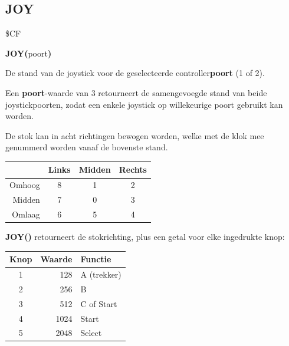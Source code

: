 \subsection{JOY}
\begin{description}[leftmargin=2cm,style=nextline]
\item [Token:]    \$CF

\item [Formaat:]   {\bf JOY(}poort{\bf)}

\item [Retourneert:]  De stand van de joystick voor de geselecteerde controller{\bf poort} (1 of 2).

                  Een {\bf poort}-waarde van 3 retourneert de samengevoegde stand van beide joystickpoorten, zodat een enkele joystick op willekeurige poort gebruikt kan worden.

                  De stok kan in acht richtingen bewogen worden, welke met de klok mee genummerd worden vanaf de bovenste stand.

                  \begin{center}
                  {\setlength{\tabcolsep}{1mm}
                  \begin{tabular}{|r|c|c|c|}
                  \hline
                  &  {\bf Links}  & {\bf Midden} & {\bf Rechts} \\
                  \hline
                  Omhoog   &  8 &    1  & 2 \\                 Midden  &  7 &    0  & 3 \\                  Omlaag  &  6 &    5  & 4 \\
                  \hline
                  \end{tabular}
                  }
                  \end{center}

                  {\bf JOY()} retourneert de stokrichting, plus een getal voor elke ingedrukte knop:

                  \begin{center}
                  \begin{tabular}{|c|r|l|}
                  \hline
                  {\bf Knop} & {\bf Waarde} & {\bf Functie} \\
                  \hline
                  1 & 128 & A (trekker) \\              2 & 256 & B \\                  3 & 512 & C of Start \\                  4 & 1024 & Start \\                  5 & 2048 & Select \\
                  \hline
                  \end{tabular}
                  \end{center}


\end{description}
